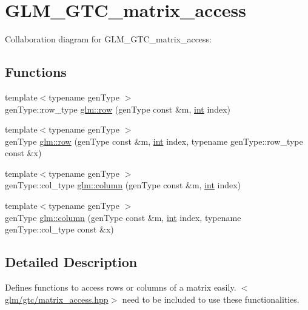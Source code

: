 \hypertarget{group__gtc__matrix__access}{}\section{G\+L\+M\+\_\+\+G\+T\+C\+\_\+matrix\+\_\+access}
\label{group__gtc__matrix__access}
Collaboration diagram for G\+L\+M\+\_\+\+G\+T\+C\+\_\+matrix\+\_\+access\+:
\subsection*{Functions}
\begin{DoxyCompactItemize}
\item 
{\footnotesize template$<$typename gen\+Type $>$ }\\gen\+Type\+::row\+\_\+type \hyperlink{group__gtc__matrix__access_ga7e90918d2599dfcce7cffdde61e0ecb4}{glm\+::row} (gen\+Type const \&m, \hyperlink{_s_d_l__thread_8h_a6a64f9be4433e4de6e2f2f548cf3c08e}{int} index)
\item 
{\footnotesize template$<$typename gen\+Type $>$ }\\gen\+Type \hyperlink{group__gtc__matrix__access_ga6f90181a0a87ea6fb1beb5b90ca31ce9}{glm\+::row} (gen\+Type const \&m, \hyperlink{_s_d_l__thread_8h_a6a64f9be4433e4de6e2f2f548cf3c08e}{int} index, typename gen\+Type\+::row\+\_\+type const \&x)
\item 
{\footnotesize template$<$typename gen\+Type $>$ }\\gen\+Type\+::col\+\_\+type \hyperlink{group__gtc__matrix__access_ga263133e2acfc1421ab17b41d2954aa8f}{glm\+::column} (gen\+Type const \&m, \hyperlink{_s_d_l__thread_8h_a6a64f9be4433e4de6e2f2f548cf3c08e}{int} index)
\item 
{\footnotesize template$<$typename gen\+Type $>$ }\\gen\+Type \hyperlink{group__gtc__matrix__access_gae0e0157f3f2d58b640937e74d81f5ea6}{glm\+::column} (gen\+Type const \&m, \hyperlink{_s_d_l__thread_8h_a6a64f9be4433e4de6e2f2f548cf3c08e}{int} index, typename gen\+Type\+::col\+\_\+type const \&x)
\end{DoxyCompactItemize}


\subsection{Detailed Description}
Defines functions to access rows or columns of a matrix easily. $<$\hyperlink{matrix__access_8hpp}{glm/gtc/matrix\+\_\+access.\+hpp}$>$ need to be included to use these functionalities. 

